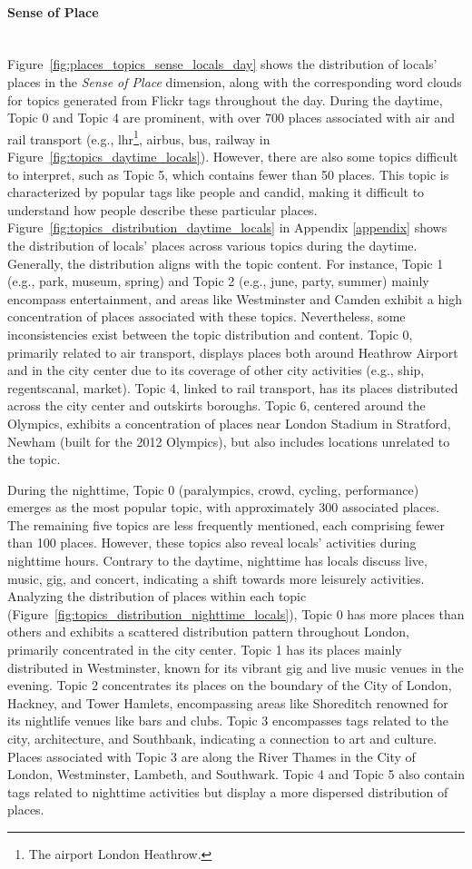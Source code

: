 \documentclass{article}
\newcommand{\subsubsubsection}[1]{\paragraph{#1}\mbox{}\\}
\theoremstyle{definition}
\theoremstyle{remark}
\begin{document}
\subsubsubsection{Sense of Place}
Figure~\ref{fig:places_topics_sense_locals_day} shows the distribution of locals' places in the \textit{Sense of Place} dimension, along with the corresponding word clouds for topics generated from Flickr tags throughout the day. During the daytime, Topic 0 and Topic 4 are prominent, with over 700 places associated with air and rail transport (e.g., lhr\footnote{The airport London Heathrow.}, airbus, bus, railway in Figure~\ref{fig:topics_daytime_locals}). However, there are also some topics difficult to interpret, such as Topic 5, which contains fewer than 50 places. This topic is characterized by popular tags like people and candid, making it difficult to understand how people describe these particular places. Figure~\ref{fig:topics_distribution_daytime_locals} in Appendix \ref{appendix} shows the distribution of locals' places across various topics during the daytime. Generally, the distribution aligns with the topic content. For instance, Topic 1 (e.g., park, museum, spring) and Topic 2 (e.g., june, party, summer) mainly encompass entertainment, and areas like Westminster and Camden exhibit a high concentration of places associated with these topics. Nevertheless, some inconsistencies exist between the topic distribution and content. Topic 0, primarily related to air transport, displays places both around Heathrow Airport and in the city center due to its coverage of other city activities (e.g., ship, regentscanal, market). Topic 4, linked to rail transport, has its places distributed across the city center and outskirts boroughs. Topic 6, centered around the Olympics, exhibits a concentration of places near London Stadium in Stratford, Newham (built for the 2012 Olympics), but also includes locations unrelated to the topic.

During the nighttime, Topic 0 (paralympics, crowd, cycling, performance) emerges as the most popular topic, with approximately 300 associated places. The remaining five topics are less frequently mentioned, each comprising fewer than 100 places. However, these topics also reveal locals' activities during nighttime hours. Contrary to the daytime, nighttime has locals discuss live, music, gig, and concert, indicating a shift towards more leisurely activities. Analyzing the distribution of places within each topic (Figure~\ref{fig:topics_distribution_nighttime_locals}), Topic 0 has more places than others and exhibits a scattered distribution pattern throughout London, primarily concentrated in the city center. Topic 1 has its places mainly distributed in Westminster, known for its vibrant gig and live music venues in the evening. Topic 2 concentrates its places on the boundary of the City of London, Hackney, and Tower Hamlets, encompassing areas like Shoreditch renowned for its nightlife venues like bars and clubs. Topic 3 encompasses tags related to the city, architecture, and Southbank, indicating a connection to art and culture. Places associated with Topic 3 are along the River Thames in the City of London, Westminster, Lambeth, and Southwark. Topic 4 and Topic 5 also contain tags related to nighttime activities but display a more dispersed distribution of places.
\end{document}
